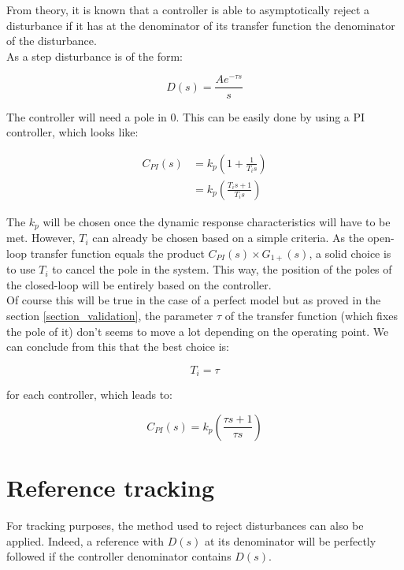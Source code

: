 From theory, it is known that a controller is able to asymptotically reject a disturbance if it has at the denominator
of its transfer function the denominator of the disturbance.\\

As a step disturbance is of the form:

\begin{equation}
    D(s) = \frac{A e^{-\tau s}}{s}
\end{equation}

The controller will need a pole in $0$. This can be easily done by using a PI controller, which looks like:

\begin{align}
    C_{PI}(s) &= k_p \left( 1 + \frac{1}{T_i s} \right)\\
    &= k_p \left(\frac{T_i s + 1}{T_i s} \right)
    \label{eq:general_PI}
\end{align}

The $k_p$ will be chosen once the dynamic response characteristics will have to be met. However, $T_i$ can already be 
chosen based on a simple criteria. As the open-loop transfer function equals the product $C_{PI}(s) \times G_{1+} (s)$, a
solid choice is to use $T_i$ to cancel the pole in the system. This way, the position of the poles of the closed-loop
will be entirely based on the controller.\\
Of course this will be true in the case of a perfect model but as proved in the section \ref{section_validation}, the
parameter $\tau$ of the transfer function (which fixes the pole of it) don't seems to move a lot depending on the 
operating point. We can conclude from this that the best choice is:

\begin{equation}
    T_i = \tau
\end{equation}

for each controller, which leads to:

\begin{equation}
    C_{PI}(s) = k_p \left( \frac{\tau s + 1}{\tau s} \right) 
    \label{eq:controller_PI}
\end{equation}


\iffalse
\section{Reference tracking}

For tracking purposes, the method used to reject disturbances can also be applied. Indeed, a reference with $D(s)$ at
its denominator will be perfectly followed if the controller denominator contains $D(s)$.


